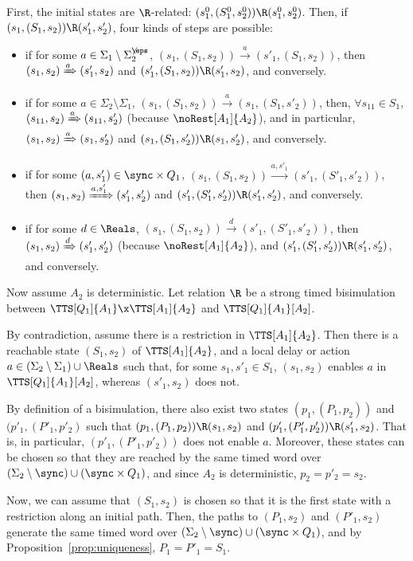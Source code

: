 \documentclass{LMCS}
\theoremstyle{plain}\newtheorem*{prop11}{Proposition~\ref{prop:states} bis}
\begin{document}
  First, the initial states
  are $\R$-related: $(s_1^0,(S_1^0,s_2^0))\R(s_1^0,s_2^0)$.
  Then, if $(s_1,(S_1,s_2))\R (s'_1,s'_2)$, four kinds of steps are possible:
  \begin{itemize}
    \item if for some $a\in \Sigma_1\setminus\Sigma_{2}^{\not\eps}$,
    $(s_1,(S_1,s_2))\xrightarrow{a}(s'_1,(S_1,s_2))$, then
    $(s_1,s_2)\xRightarrow{a}(s'_1,s_2)$ and $(s'_1,(S_1,s_2))\R(s'_1,s_2)$,
    and conversely.
    \item if for some $a\in \Sigma_2\setminus\Sigma_1$,
    $(s_1,(S_1,s_2))\xrightarrow{a}(s_1,(S_1,s'_2))$, then, $\forall s_{11}\in S_1$,
    $(s_{11},s_2)\xRightarrow{a}(s_{11},s'_2)$ (because $\noRest[A_1]{A_2}$),
    and in particular, $(s_1,s_2)\xRightarrow{a}(s_1,s'_2)$ and
    $(s_1,(S_1,s'_2))\R(s_1,s'_2)$, and conversely.
    \item if for some $(a,s'_1)\in \sync\times Q_1$,
    $(s_1,(S_1,s_2))\xrightarrow{a,s'_1}(s'_1,(S'_1,s'_2))$, then
    $(s_1,s_2)\xRightarrow{a,s'_1}(s'_1,s'_2)$ and $(s'_1,(S'_1,s'_2))\R(s'_1,s'_2)$,
    and conversely.
    \item if for some $d\in \Reals$,
    $(s_1,(S_1,s_2))\xrightarrow{d}(s'_1,(S'_1,s'_2))$, then
    $(s_1,s_2)\xRightarrow{d}(s'_1,s'_2)$ (because $\noRest[A_1]{A_2}$),
    and $(s'_1,(S'_1,s'_2))\R(s'_1,s'_2)$, and conversely.
  \end{itemize}

  \noindent Now assume $A_2$ is deterministic.
  Let relation $\R$ be a strong timed bisimulation between $\TTS[Q_1]{A_1}\x\TTS[A_1]{A_2}$ and
  $\TTS[Q_1]{A_1}[A_2]$. 

  By contradiction, assume there is a restriction in $\TTS[A_1]{A_2}$. Then
  there is a reachable state $(S_1,s_2)$ of $\TTS[A_1]{A_2}$, and a local
  delay or action $a\in (\Sigma_2\setminus\Sigma_1)\cup\Reals$ such that, for
  some $s_1,s'_1\in S_1$, $(s_1,s_2)$ enables $a$ in
  $\TTS[Q_1]{A_1}[A_2]$, whereas $(s'_1,s_2)$ does not.

  By definition of a bisimulation, there also exist two states
  $(p_1,(P_1,p_2))$ and $(p'_1,(P'_1,p'_2)$ such that
  $(p_1,(P_1,p_2))\R(s_1,s_2)$ and $(p'_1,(P'_1,p'_2))\R(s'_1,s_2)$. That
  is, in particular, $(p'_1,(P'_1,p'_2))$ does not enable $a$.
Moreover, these states can be chosen so that they are reached by the same
  timed word over $(\Sigma_2\setminus\sync)\cup(\sync\times Q_1)$, and since
  $A_2$ is deterministic, $p_2=p'_2=s_2$.


  Now, we can assume that $(S_1,s_2)$ is chosen so that it is the first state
  with a restriction along an initial path. Then, the paths to $(P_1,s_2)$ and
  $(P'_1,s_2)$ generate the same timed word over
  $(\Sigma_2\setminus\sync)\cup(\sync\times Q_1)$, and by
  Proposition~\ref{prop:uniqueness}, $P_1=P'_1=S_1$. 
\end{document}
